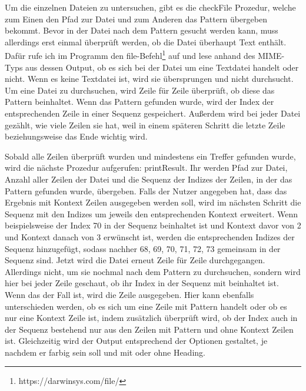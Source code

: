 \documentclass[11pt]{report}
\begin{document}
Um die einzelnen Dateien zu untersuchen, gibt es die checkFile Prozedur, welche zum Einen den Pfad zur Datei und zum Anderen das Pattern übergeben bekommt.
Bevor in der Datei nach dem Pattern gesucht werden kann, muss allerdings erst einmal überprüft werden, ob die Datei überhaupt Text enthält. Dafür rufe ich im Programm den file-Befehl\footnote{https://darwinsys.com/file/} auf und lese anhand des MIME-Typs aus dessen Output, ob es sich bei der Datei um eine Textdatei handelt oder nicht. Wenn es keine Textdatei ist, wird sie übersprungen und nicht durchsucht.
\newline
Um eine Datei zu durchsuchen, wird Zeile für Zeile überprüft, ob diese das Pattern beinhaltet. Wenn das Pattern gefunden wurde, wird der Index der entsprechenden Zeile in einer Sequenz gespeichert. Außerdem wird bei jeder Datei gezählt, wie viele Zeilen sie hat, weil in einem späteren Schritt die letzte Zeile beziehungsweise das Ende wichtig wird.

Sobald alle Zeilen überprüft wurden und mindestens ein Treffer gefunden wurde, wird die nächste Prozedur aufgerufen: printResult. Ihr werden Pfad zur Datei, Anzahl aller Zeilen der Datei und die Sequenz der Indizes der Zeilen, in der das Pattern gefunden wurde, übergeben. Falls der Nutzer angegeben hat, dass das Ergebnis mit Kontext Zeilen ausgegeben werden soll, wird im nächsten Schritt die Sequenz mit den Indizes um jeweils den entsprechenden Kontext erweitert.
\newline
Wenn beispielsweise der Index 70 in der Sequenz beinhaltet ist und Kontext davor von 2 und Kontext danach von 3 erwünscht ist, werden die entsprechenden Indizes der Sequenz hinzugefügt, sodass nachher 68, 69, 70, 71, 72, 73 gemeinsam in der Sequenz sind.
\newline
Jetzt wird die Datei erneut Zeile für Zeile durchgegangen. Allerdings nicht, um sie nochmal nach dem Pattern zu durchsuchen, sondern wird hier bei jeder Zeile geschaut, ob ihr Index in der Sequenz mit beinhaltet ist. Wenn das der Fall ist, wird die Zeile ausgegeben. Hier kann ebenfalls unterschieden werden, ob es sich um eine Zeile mit Pattern handelt oder ob es nur eine Kontext Zeile ist, indem zusätzlich überprüft wird, ob der Index auch in der Sequenz bestehend nur aus den Zeilen mit Pattern und ohne Kontext Zeilen ist.
Gleichzeitig wird der Output entsprechend der Optionen gestaltet, je nachdem er farbig sein soll und mit oder ohne Heading.
\end{document}
